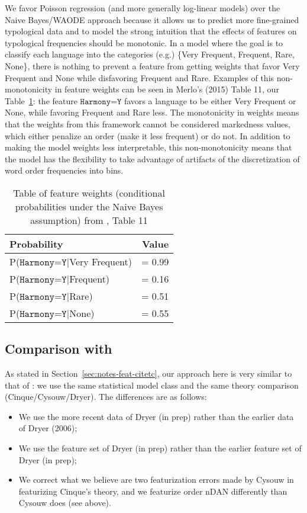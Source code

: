 \documentclass[11pt]{article}
\begin{document}
We favor Poisson regression (and more generally log-linear models) over the Naive Bayes/WAODE approach because it allows us to predict more fine-grained typological data and to model the strong intuition that the effects of features on typological frequencies should be monotonic.
In a model where the goal is to classify each language into the categories (e.g.) \{Very Frequent, Frequent, Rare, None\}, there is nothing to prevent a feature from getting weights that favor Very Frequent and None while disfavoring Frequent and Rare.
Examples of this non-monotonicity in feature weights can be seen in Merlo's (2015) Table 11, our Table~\ref{tab:merlo-table}: the feature $\texttt{Harmony=Y}$ favors a language to be either Very Frequent or None, while favoring Frequent and Rare less.
The monotonicity in weights means that the weights from this framework cannot be considered markedness values, which either penalize an order (make it less frequent) or do not.
In addition to making the model weights less interpretable, this non-monotonicity means that the model has the flexibility to take advantage of artifacts of the discretization of word order frequencies into bins.

\begin{table}
  \centering
  \begin{tabular}{|l r|}
    \hline
    Probability & Value \\
    \hline
    P($\texttt{Harmony=Y}|$Very Frequent) & = 0.99 \\
    P($\texttt{Harmony=Y}|$Frequent) & = 0.16 \\
    P($\texttt{Harmony=Y}|$Rare) & = 0.51 \\
    P($\texttt{Harmony=Y}|$None) & = 0.55 \\    
    \hline
  \end{tabular}
  \caption{Table of feature weights (conditional probabilities under the Naive Bayes assumption) from \citet{merlo2015predicting}, Table 11}
  \label{tab:merlo-table}
\end{table}



\subsection{Comparison with \citet{cysouw2010dealing}}
\label{sec:comp-with-citetcys}

As stated in Section~\ref{sec:notes-feat-citetc}, our approach here is
very similar to that of \citet{cysouw2010dealing}: we use the same
statistical model class and the same theory comparison
(Cinque/Cysouw/Dryer).  The differences are as follows:
%
\begin{itemize}
\item We use the more recent data of Dryer (in prep) rather than the
  earlier data of Dryer (2006);
\item We use the feature set of Dryer (in prep) rather than the
  earlier feature set of Dryer (in prep);
\item We correct what we believe are two featurization errors made by
  Cysouw in featurizing Cinque's theory, and we featurize order nDAN
  differently than Cysouw does (see above).
\end{itemize}
\end{document}
